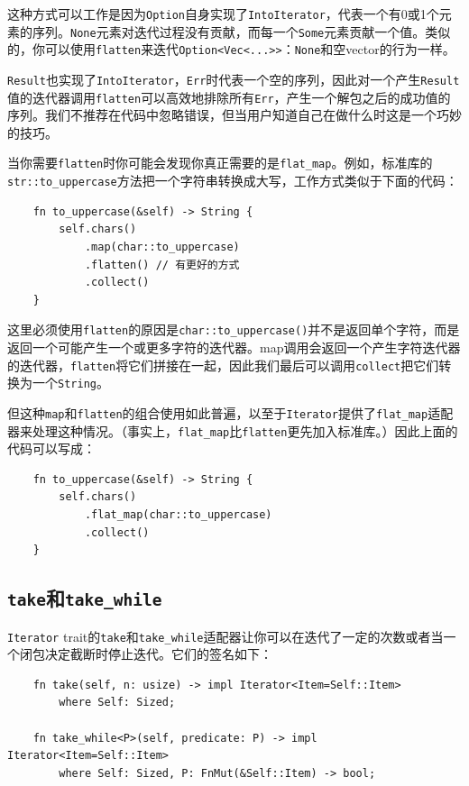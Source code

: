 这种方式可以工作是因为\texttt{Option}自身实现了\texttt{IntoIterator}，代表一个有0或1个元素的序列。\texttt{None}元素对迭代过程没有贡献，而每一个\texttt{Some}元素贡献一个值。类似的，你可以使用\texttt{flatten}来迭代\texttt{Option<Vec<...>>}：\texttt{None}和空vector的行为一样。

\texttt{Result}也实现了\texttt{IntoIterator}，\texttt{Err}时代表一个空的序列，因此对一个产生\texttt{Result}值的迭代器调用\texttt{flatten}可以高效地排除所有\texttt{Err}，产生一个解包之后的成功值的序列。我们不推荐在代码中忽略错误，但当用户知道自己在做什么时这是一个巧妙的技巧。

当你需要\texttt{flatten}时你可能会发现你真正需要的是\texttt{flat\_map}。例如，标准库的\\
\texttt{str::to\_uppercase}方法把一个字符串转换成大写，工作方式类似于下面的代码：
\begin{verbatim}
    fn to_uppercase(&self) -> String {
        self.chars()
            .map(char::to_uppercase)
            .flatten() // 有更好的方式
            .collect()
    }
\end{verbatim}

这里必须使用\texttt{flatten}的原因是\texttt{char::to\_uppercase()}并不是返回单个字符，而是返回一个可能产生一个或更多字符的迭代器。map调用会返回一个产生字符迭代器的迭代器，\texttt{flatten}将它们拼接在一起，因此我们最后可以调用\texttt{collect}把它们转换为一个\texttt{String}。

但这种\texttt{map}和\texttt{flatten}的组合使用如此普遍，以至于\texttt{Iterator}提供了\texttt{flat\_map}适配器来处理这种情况。（事实上，\texttt{flat\_map}比\texttt{flatten}更先加入标准库。）因此上面的代码可以写成：
\begin{verbatim}
    fn to_uppercase(&self) -> String {
        self.chars()
            .flat_map(char::to_uppercase)
            .collect()
    }
\end{verbatim}

\subsection{\texttt{take}和\texttt{take\_while}}
\texttt{Iterator} trait的\texttt{take}和\texttt{take\_while}适配器让你可以在迭代了一定的次数或者当一个闭包决定截断时停止迭代。它们的签名如下：
\begin{verbatim}
    fn take(self, n: usize) -> impl Iterator<Item=Self::Item>
        where Self: Sized;
    
    fn take_while<P>(self, predicate: P) -> impl Iterator<Item=Self::Item>
        where Self: Sized, P: FnMut(&Self::Item) -> bool;
\end{verbatim}

